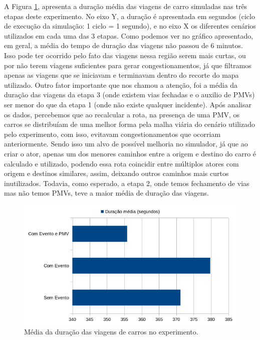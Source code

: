 A Figura \ref{fig:duracao_total}, apresenta a duração média das viagens de carro simuladas nas três etapas deste experimento.
No eixo Y, a duração é apresentada em segundos (ciclo de execução da simulação: 1 ciclo = 1 segundo), e no eixo X os diferentes cenários utilizados em cada uma das 3 etapas.
Como podemos ver no gráfico apresentado, em geral, a média do tempo de duração das viagens não passou de 6 minutos.
Isso pode ter ocorrido pelo fato das viagens nessa região serem mais curtas, ou por não terem viagens suficientes para gerar congestionamentos, já que filtramos apenas as viagens que se iniciavam e
terminavam dentro do recorte do mapa utilizado.
Outro fator importante que nos chamou a atenção, foi a média da duração das viagens da etapa 3 (onde existem vias fechadas e o auxilio de PMVs) ser menor do que da etapa 1 (onde não existe qualquer
incidente).
Após analisar os dados, percebemos que ao recalcular a rota, na presença de uma PMV, os carros se distribuíam de uma melhor forma pela malha viária do cenário utilizado pelo experimento, com isso,
evitavam congestionamentos que ocorriam anteriormente.
Sendo isso um alvo de possível melhoria no simulador, já que ao criar o ator, apenas um dos menores caminhos entre a origem e destino do carro é calculado e utilizado, podendo essa rota coincidir entre
múltiplos atores com origem e destinos similares, assim, deixando outros caminhos mais curtos inutilizados.
Todavia, como esperado, a etapa 2, onde temos fechamento de vias mas não temos PMVs, teve a maior média de duração das viagens.

\begin{figure}[ht]
	\centering
	\includegraphics[width=\textwidth]{figuras/duracao_total.png}
	\caption{Média da duração das viagens de carros no experimento.}
	\label{fig:duracao_total}
\end{figure}

